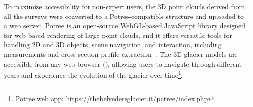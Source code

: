 To maximize accessibility for non-expert users, the 3D point clouds derived from all the surveys were converted to a Potree-compatible structure \citep{schutz2016potree} and uploaded to a web server.
Potree is an open-source WebGL-based JavaScript library designed for web-based rendering of large-point clouds, and it offers versatile tools for handling 2D and 3D objects, scene navigation, and interaction, including measurements and cross-section profile extraction~\citep{Gaspari2024, Fascia2024}.
The 3D glacier models are accessible from any web browser (), allowing users to navigate through different years and experience the evolution of the glacier over time\footnote{Potree web app: \label{the-belvedere-glacier-website}\url{https://thebelvedereglacier.it/potree/index.php}}.

